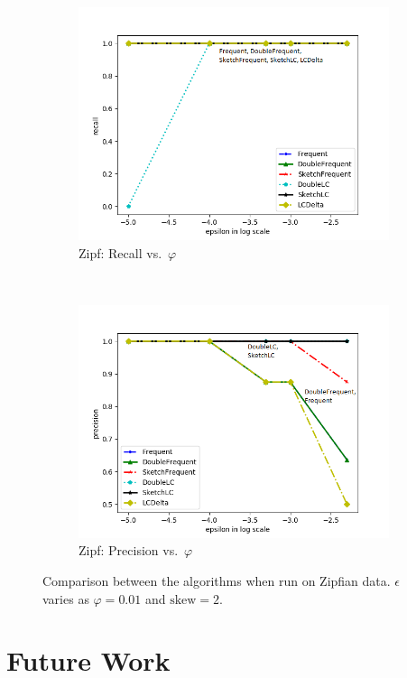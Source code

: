 \documentclass[sigconf,review=true,anonymous=true,screen]{acmart}
\renewcommand{\phi}{\varphi}
\begin{document}
\begin{figure}
\begin{subfigure}[b]{0.3\textwidth}
\includegraphics[width=\textwidth]{../Plots/recall_epsilonskew.png}
\caption{Zipf: Recall vs.~$\phi$}
\end{subfigure}
~
\begin{subfigure}[b]{0.3\textwidth}
\includegraphics[width=\textwidth]{../Plots/precision_epsilonskew.png}
\caption{Zipf: Precision vs.~$\phi$}
\end{subfigure}
\caption{Comparison between the algorithms when run on Zipfian data. $\epsilon$ varies as $\phi = 0.01$ and $\text{skew} = 2$.}
\end{figure}



\section{Future Work}

\clearpage
%



% 
\end{document}
